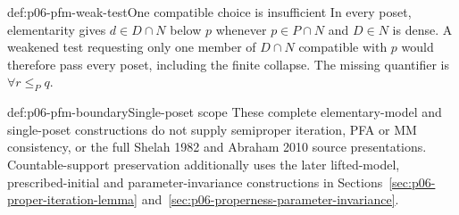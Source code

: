 \begin{hbwarning}{def:p06-pfm-weak-test}{One compatible choice is insufficient}
In every poset, elementarity gives \(d\in D\cap N\) below \(p\) whenever
\(p\in P\cap N\) and \(D\in N\) is dense.
A weakened test requesting only one member of \(D\cap N\) compatible with
\(p\) would therefore pass every poset, including the finite collapse.
The missing quantifier is \(\forall r\leq_P q\).
\end{hbwarning}

\begin{proofboundary}{def:p06-pfm-boundary}{Single-poset scope}
These complete elementary-model and single-poset constructions do not
supply semiproper iteration, PFA or MM consistency, or the full
Shelah 1982 and Abraham 2010 source presentations. Countable-support
preservation additionally uses the later lifted-model, prescribed-initial
and parameter-invariance constructions in
Sections~\ref{sec:p06-proper-iteration-lemma}
and~\ref{sec:p06-properness-parameter-invariance}.
\end{proofboundary}
